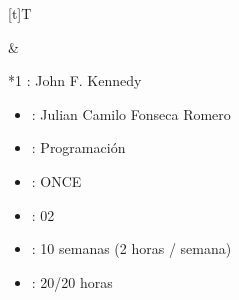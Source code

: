 \documentclass[letterpaper,10pt,spanish]{sphinxmanual}
\begin{document}
\begin{savenotes}\sphinxattablestart
\sphinxthistablewithglobalstyle
\centering
\begin{tabular}[t]{}
\sphinxtoprule
\sphinxtableatstartofbodyhook

\begin{savenotes}\sphinxattablestart
\sphinxthistablewithglobalstyle
\centering
\begin{tabulary}{\linewidth}[t]{T}
\sphinxtoprule
\sphinxtableatstartofbodyhook
\sphinxAtStartPar
{}
\\
\sphinxbottomrule
\end{tabulary}
\sphinxtableafterendhook\par
\sphinxattableend\end{savenotes}
&

\begin{savenotes}\sphinxattablestart
\sphinxthistablewithglobalstyle
\raggedright
\begin{tabular}[t]{*{1}{}}
\sphinxtoprule
\sphinxtableatstartofbodyhook
\sphinxAtStartPar
{}: John F. Kennedy
\begin{itemize}
\item {} 
\sphinxAtStartPar
{}: Julian Camilo Fonseca Romero

\item {} 
\sphinxAtStartPar
{}: Programación

\item {} 
\sphinxAtStartPar
{}: ONCE

\item {} 
\sphinxAtStartPar
{}: 02

\item {} 
\sphinxAtStartPar
{}: 10 semanas (2 horas / semana)

\item {} 
\sphinxAtStartPar
{}: 20/20 horas

\end{itemize}
\\
\sphinxbottomrule
\end{tabular}
\sphinxtableafterendhook\par
\sphinxattableend\end{savenotes}
\\
\sphinxbottomrule
\end{tabular}
\sphinxtableafterendhook\par
\sphinxattableend\end{savenotes}
\end{document}
